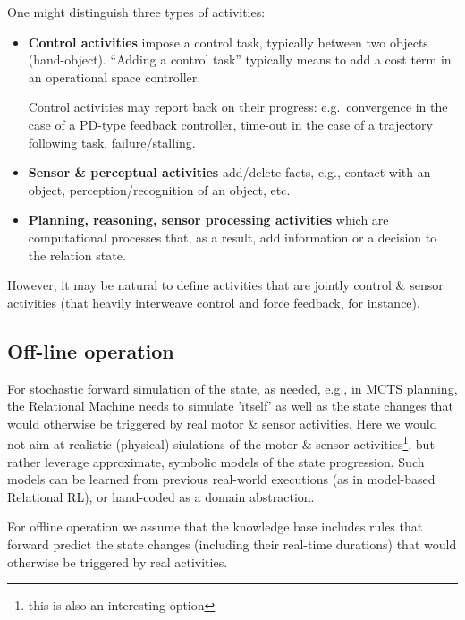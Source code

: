 \documentclass[10pt,fleqn,twoside]{article}
\begin{document}
One might distinguish three types of activities:
\begin{itemize}
\item \textbf{Control activities} impose a control task, typically
  between two objects (hand-object). ``Adding a control task''
  typically means to add a cost term in an operational space
  controller.

  Control activities may report back on their progress:
  e.g.\ convergence in the case of a PD-type feedback controller,
  time-out in the case of a trajectory following task,
  failure/stalling.

\item \textbf{Sensor \& perceptual activities} add/delete facts, e.g.,
  contact with an object, perception/recognition of an object, etc.

\item \textbf{Planning, reasoning, sensor processing activities} which
  are computational processes that, as a result, add information or a
  decision to the relation state.
\end{itemize}

However, it may be natural to define activities that are jointly
control \& sensor activities (that heavily interweave control and
force feedback, for instance).


\subsection{Off-line operation}

For stochastic forward simulation of the state, as needed, e.g., in MCTS
planning, the Relational Machine needs to simulate 'itself' as well as
the state changes that would otherwise be triggered by real motor \&
sensor activities. Here we would not aim at realistic (physical)
siulations of the motor \& sensor activities\footnote{this is also an
  interesting option}, but rather leverage approximate, symbolic models
of the state progression. Such models can be learned from previous
real-world executions (as in model-based Relational RL), or hand-coded
as a domain abstraction.

For offline operation we assume that the knowledge base includes rules
that forward predict the state changes (including their real-time
durations) that would otherwise be triggered by real activities. 
\end{document}
